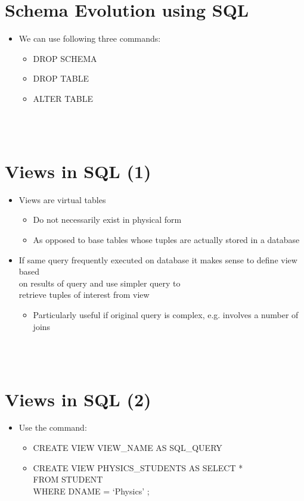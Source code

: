 \documentclass[12pt]{article}
\begin{document}
\section{Schema Evolution using SQL}
\begin{itemize}
  \item We can use following three commands:
\begin{itemize}
  \item DROP SCHEMA
  \item DROP TABLE
  \item ALTER TABLE
\end{itemize}
\end{itemize}
\\ 
 \\
\section{Views in SQL (1)}
\begin{itemize}
  \item Views are virtual tables
\begin{itemize}
  \item Do not necessarily exist in physical form
  \item As opposed to base tables whose tuples are 
actually stored in a database\\
\end{itemize}
  \item If same query frequently executed on 
database it makes sense to define view based \\
on results of query and use simpler query to \\
retrieve tuples of interest from view\\
\begin{itemize}
  \item Particularly useful if original query is complex,
e.g. involves a number of joins\\
\end{itemize}
\end{itemize}
\\ 
 \\
\section{Views in SQL (2)}
\begin{itemize}
  \item Use the command:
\begin{itemize}
  \item CREATE VIEW \<VIEW\_NAME\> AS
\<SQL\_QUERY\>\\
  \item CREATE VIEW PHYSICS\_STUDENTS AS
SELECT *\\
FROM STUDENT\\
WHERE   DNAME = ‘Physics’ ;\\
\end{itemize}
\end{itemize}
\\ 
 \\
\end{document}
